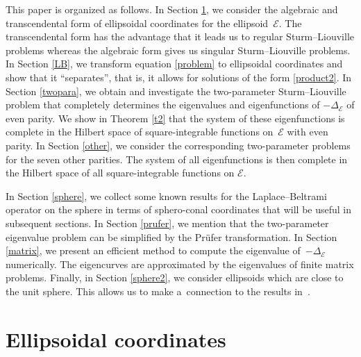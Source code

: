 \documentclass[10pt,a4paper]{amsart}
\newcommand{\E}{\mathcal{E}}
\newcommand{\D}{\Delta_\E}
\numberwithin{equation}{section}
\begin{document}
This paper is organized as follows. In Section \ref{coords}, we consider the algebraic and transcendental form of ellipsoidal coordinates for the ellipsoid~$\E$.
The transcendental form has the advantage that it leads us to regular Sturm--Liouville problems
whereas the algebraic form gives us singular Sturm--Liouville problems.
In Section \ref{LB}, we transform equation \eqref{problem}
to ellipsoidal coordinates
and show that it ``separates'', that is, it allows for solutions of the form \eqref{product2}.
In Section \ref{twopara}, we obtain and investigate the two-parameter Sturm--Liouville problem that
completely determines the eigenvalues and eigenfunctions of $-\D$ of even parity.
We show in Theorem \ref{t2} that the system of these eigenfunctions is complete in the Hilbert space of square-integrable functions on~$\E$ with even parity.
In Section \ref{other}, we consider the corresponding two-parameter problems for the seven other parities.
The system of all eigenfunctions is then complete in the Hilbert space of all square-integrable functions on $\E$.

In Section \ref{sphere}, we collect some known results for the Laplace--Beltrami operator on the sphere
in terms of sphero-conal coordinates that will be useful in subsequent sections.
In Section \ref{prufer}, we mention that the two-parameter eigenvalue problem
can be simplified by the Pr\"ufer transformation.
In Section \ref{matrix}, we present an efficient method to compute the eigenvalue of~$-\D$ numerically.
The eigencurves are approximated by the eigenvalues of finite matrix problems.
Finally, in Section \ref{sphere2}, we consider ellipsoids which are close to the unit sphere.
This allows us to make a~connection to the results in~\cite{EK}.


\section{Ellipsoidal coordinates}\label{coords}
\end{document}
